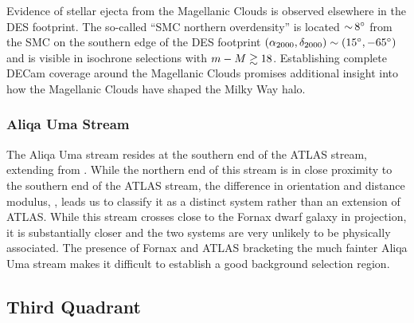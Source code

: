 \documentclass[twocolumn]{aastex61}
\begin{document}
Evidence of stellar ejecta from the Magellanic Clouds is observed elsewhere in the DES footprint.
The so-called ``SMC northern overdensity'' \citep{Pieres:2016} is located $ {\sim}\, 8{}^{\circ}$ from the SMC on the southern edge of the DES footprint $({\alpha_{2000}},{\delta_{2000}}) \sim (15{}^{\circ}, -65{}^{\circ})$ and is visible in isochrone selections with $m - M \gtrsim 18$.
Establishing complete DECam coverage around the Magellanic Clouds promises additional insight into how the Magellanic Clouds have shaped the Milky Way halo.

\subsubsection{Aliqa Uma Stream}
\label{sec:fornax}

The Aliqa Uma stream resides at the southern end of the ATLAS stream, extending from . 
While the northern end of this stream is in close proximity to the southern end of the ATLAS stream, the difference in orientation and distance modulus, , leads us to classify it as a distinct system rather than an extension of ATLAS.
While this stream crosses close to the Fornax dwarf galaxy in projection, it is substantially closer and the two systems are very unlikely to be physically associated.
The presence of Fornax and ATLAS bracketing the much fainter Aliqa Uma stream makes it difficult to establish a good background selection region.

\subsection{Third Quadrant}
\label{sec:q3}
\end{document}

